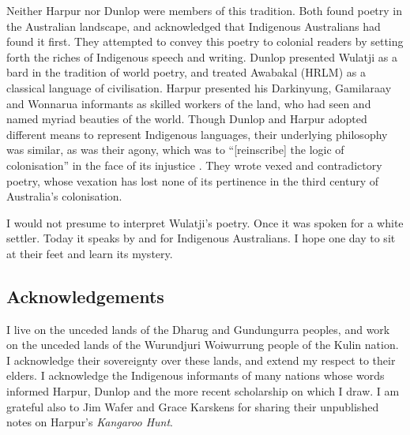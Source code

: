 \documentclass[
  Crown,
  times,
  sageh]{sagej}
\begin{document}
Neither Harpur nor Dunlop were members of this tradition. Both found
poetry in the Australian landscape, and acknowledged that Indigenous
Australians had found it first. They attempted to convey this poetry to
colonial readers by setting forth the riches of Indigenous speech and
writing. Dunlop presented Wulatji as a bard in the tradition of world
poetry, and treated Awabakal (HRLM) as a classical language of
civilisation. Harpur presented his Darkinyung, Gamilaraay and Wonnarua
informants as skilled workers of the land, who had seen and named myriad
beauties of the world. Though Dunlop and Harpur adopted different means
to represent Indigenous languages, their underlying philosophy was
similar, as was their agony, which was to ``{[}reinscribe{]} the logic
of colonisation'' in the face of its injustice
\citep[113]{minter_settlement_2021}. They wrote vexed and contradictory
poetry, whose vexation has lost none of its pertinence in the third
century of Australia's colonisation.

I would not presume to interpret Wulatji's poetry. Once it was spoken
for a white settler. Today it speaks by and for Indigenous Australians.
I hope one day to sit at their feet and learn its mystery.

\subsection{Acknowledgements}\label{acknowledgements}

I live on the unceded lands of the Dharug and Gundungurra peoples, and
work on the unceded lands of the Wurundjuri Woiwurrung people of the
Kulin nation. I acknowledge their sovereignty over these lands, and
extend my respect to their elders. I acknowledge the Indigenous
informants of many nations whose words informed Harpur, Dunlop and the
more recent scholarship on which I draw. I am grateful also to Jim Wafer
and Grace Karskens for sharing their unpublished notes on Harpur's
\emph{Kangaroo Hunt}.


\end{document}
